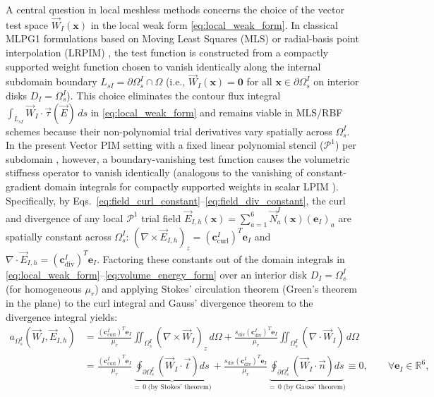 \documentclass[VANCOUVER,Times1COL]{WileyNJD-v5}
\begin{document}
A central question in local meshless methods concerns the choice of the vector test space $\vec{W}_I(\mathbf{x})$ in the local weak form \eqref{eq:local_weak_form}. In classical MLPG1 formulations based on Moving Least Squares (MLS) \cite{atluri1998new, atluri2002meshless} or radial-basis point interpolation (LRPIM) \cite{liu2005introduction}, the test function is constructed from a compactly supported weight function chosen to vanish identically along the internal subdomain boundary $L_{sI} = \partial\Omega_s^I \cap \Omega$ (i.e., $\vec{W}_I(\mathbf{x}) = \mathbf{0}$ for all $\mathbf{x} \in \partial\Omega_s^I$ on interior disks $D_I = \Omega_s^I$). This choice eliminates the contour flux integral $\int_{L_{sI}} \vec{W}_I \cdot \vec{\tau}(\vec{E}) \, ds$ in \eqref{eq:local_weak_form} and remains viable in MLS/RBF schemes because their non-polynomial trial derivatives vary spatially across $\Omega_s^I$. In the present Vector PIM setting with a fixed linear polynomial stencil ($\mathcal{P}^1$) per subdomain \cite{liu2001local, stable_vnmm2d_2026}, however, a boundary-vanishing test function causes the volumetric stiffness operator to vanish identically (analogous to the vanishing of constant-gradient domain integrals for compactly supported weights in scalar LPIM \cite{liu2001local}). Specifically, by Eqs.~\eqref{eq:field_curl_constant}--\eqref{eq:field_div_constant}, the curl and divergence of any local $\mathcal{P}^1$ trial field $\vec{E}_{I,h}(\mathbf{x}) = \sum_{a=1}^6 \vec{N}_a^I(\mathbf{x})(\mathbf{e}_I)_a$ are spatially constant across $\Omega_s^I$: $(\nabla \times \vec{E}_{I,h})_z = (\mathbf{c}_{\mathrm{curl}}^I)^T \mathbf{e}_I$ and $\nabla \cdot \vec{E}_{I,h} = (\mathbf{c}_{\mathrm{div}}^I)^T \mathbf{e}_I$. Factoring these constants out of the domain integrals in \eqref{eq:local_weak_form}--\eqref{eq:volume_energy_form} over an interior disk $D_I = \Omega_s^I$ (for homogeneous $\mu_r$) and applying Stokes' circulation theorem (Green's theorem in the plane) to the curl integral and Gauss' divergence theorem to the divergence integral yields:
\begin{equation}
    \begin{aligned}
        a_{\Omega_s^I}(\vec{W}_I, \vec{E}_{I,h}) & = \frac{(\mathbf{c}_{\mathrm{curl}}^I)^T \mathbf{e}_I}{\mu_r} \iint_{\Omega_s^I} (\nabla \times \vec{W}_I)_z \, d\Omega + \frac{s_{\mathrm{div}} (\mathbf{c}_{\mathrm{div}}^I)^T \mathbf{e}_I}{\mu_r} \iint_{\Omega_s^I} (\nabla \cdot \vec{W}_I) \, d\Omega \\
                                                 & = \frac{(\mathbf{c}_{\mathrm{curl}}^I)^T \mathbf{e}_I}{\mu_r} \underbrace{\oint_{\partial\Omega_s^I} \left(\vec{W}_I \cdot \vec{t}\right) ds}_{=\,0 \;\text{(by Stokes' theorem)}} + \frac{s_{\mathrm{div}} (\mathbf{c}_{\mathrm{div}}^I)^T \mathbf{e}_I}{\mu_r} \underbrace{\oint_{\partial\Omega_s^I} \left(\vec{W}_I \cdot \vec{n}\right) ds}_{=\,0 \;\text{(by Gauss' theorem)}} \equiv 0, \qquad \forall \mathbf{e}_I \in \mathbb{R}^6,
    \end{aligned}
    \label{eq:mlpg1_stiffness_collapse}
\end{equation}
\end{document}
